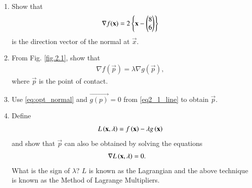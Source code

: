 \begin{enumerate}[label=\arabic*.,ref=\thesubsection.\theenumi]
\item Show that 
\begin{align}
\nabla f(\mathbf{x}) = 2\left\{\mathbf{x}-\begin{pmatrix}8 \\ 6\end{pmatrix}\right\}
\end{align}
%
is the direction vector of the normal at $\vec{x}$.
\item From Fig. \ref{fig.2.1}, show that 
\begin{align}
\label{eq:opt_normal}
\nabla f(\vec{p}) = \lambda \nabla g(\vec{p}),
\end{align}
%
where $\vec{p}$ is the point of contact.
\item Use \eqref{eq:opt_normal} and $\vec{g(p)}=0$ from \eqref{eq2_1_line} to obtain $\vec{p}$.
\item
\label{lagrange}
	Define 
	\begin{equation}
	\label{lagrangian}
	L\brak{\mbf{x},\lambda} = f\brak{\mbf{x}} - \lambda g\brak{\mbf{x}}%
	\end{equation}
and show that $\vec{p}$ can also be obtained by 
solving the equations
%
\begin{align}
\nabla L\left(\mathbf{x},\lambda\right) &= 0.
\label{tangent}
\end{align}
%
What is the sign of $\lambda$?  $L$ is known as the Lagrangian and the above technique is known as the Method of Lagrange Multipliers.


\end{enumerate}
